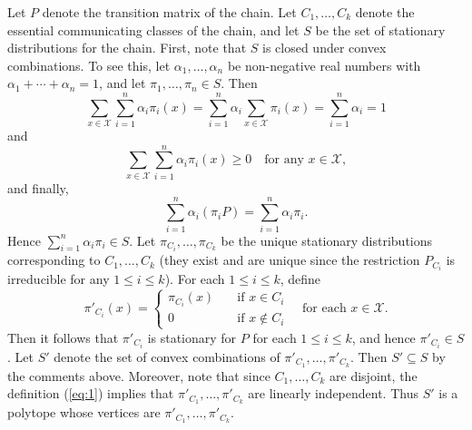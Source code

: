 \documentclass[12pt]{article}
\begin{document}
Let $P$ denote the transition matrix of the chain. Let $C_1, \ldots, C_k$ denote the essential communicating classes of the chain, and let $S$ be the set of stationary distributions for the chain. First, note that $S$ is closed under convex combinations. To see this, let $\alpha_1, \ldots, \alpha_n$ be non-negative real numbers with $\alpha_1 + \cdots + \alpha_n = 1$, and let $\pi_1, \ldots, \pi_n \in S$. Then
\begin{equation*}
\sum_{x \in \mathcal{X}} \sum_{i=1}^n \alpha_i \pi_i(x) = \sum_{i=1}^n \alpha_i \sum_{x \in \mathcal{X}} \pi_i(x) = \sum_{i=1}^n \alpha_i = 1
\end{equation*}
and
\begin{equation*}
\sum_{x \in \mathcal{X}} \sum_{i=1}^n \alpha_i \pi_i(x) \geq 0 \quad \text{for any $x \in \mathcal{X}$},
\end{equation*}
and finally,
\begin{equation*}
\sum_{i=1}^n \alpha_i (\pi_i P) = \sum_{i=1}^n \alpha_i \pi_i.
\end{equation*}
Hence $\sum_{i=1}^n \alpha_i \pi_i \in S$. Let $\pi_{C_i}, \ldots, \pi_{C_k}$ be the unique stationary distributions corresponding to $C_1, \ldots, C_k$ (they exist and are unique since the restriction $P_{C_i}$ is irreducible for any $1 \leq i \leq k$). For each $1 \leq i \leq k$, define
\begin{equation} \label{eq:1}
\pi'_{C_i}(x) = \begin{cases}
\pi_{C_i}(x) & \quad \text{if $x \in C_i$} \\
0 & \quad \text{if $x \not \in C_i$}
\end{cases} \quad \text{for each $x \in \mathcal{X}$}.
\end{equation}
Then it follows that $\pi'_{C_i}$ is stationary for $P$ for each $1 \leq i \leq k$, and hence $\pi'_{C_i} \in S$. Let $S'$ denote the set of convex combinations of $\pi'_{C_1}, \ldots, \pi'_{C_k}$. Then $S' \subseteq S$ by the comments above. Moreover, note that since $C_1, \ldots, C_k$ are disjoint, the definition (\ref{eq:1}) implies that $\pi'_{C_1}, \ldots, \pi'_{C_k}$ are linearly independent. Thus $S'$ is a polytope whose vertices are $\pi'_{C_1}, \ldots, \pi'_{C_k}$.
\end{document}

